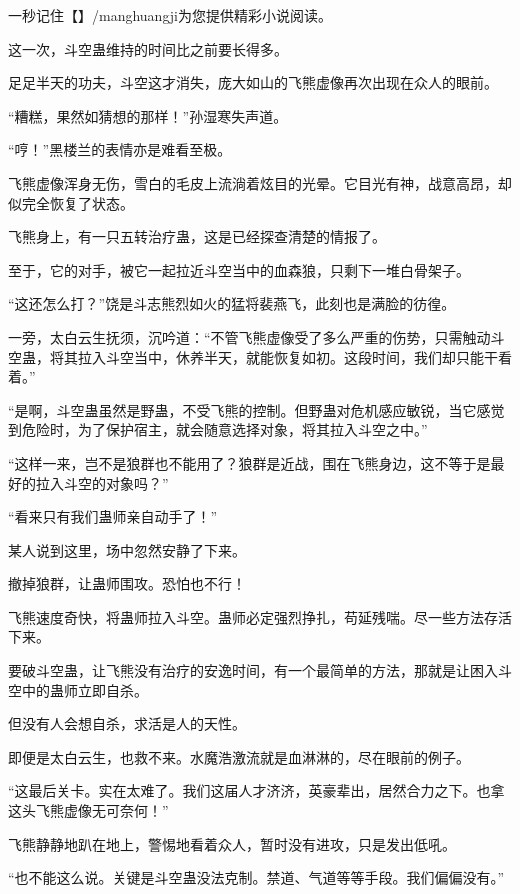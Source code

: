 
\begin{this_body}

一秒记住【】/manghuangji为您提供精彩小说阅读。

这一次，斗空蛊维持的时间比之前要长得多。

足足半天的功夫，斗空这才消失，庞大如山的飞熊虚像再次出现在众人的眼前。

“糟糕，果然如猜想的那样！”孙湿寒失声道。

“哼！”黑楼兰的表情亦是难看至极。

飞熊虚像浑身无伤，雪白的毛皮上流淌着炫目的光晕。它目光有神，战意高昂，却似完全恢复了状态。

飞熊身上，有一只五转治疗蛊，这是已经探查清楚的情报了。

至于，它的对手，被它一起拉近斗空当中的血森狼，只剩下一堆白骨架子。

“这还怎么打？”饶是斗志熊烈如火的猛将裴燕飞，此刻也是满脸的彷徨。

一旁，太白云生抚须，沉吟道：“不管飞熊虚像受了多么严重的伤势，只需触动斗空蛊，将其拉入斗空当中，休养半天，就能恢复如初。这段时间，我们却只能干看着。”

“是啊，斗空蛊虽然是野蛊，不受飞熊的控制。但野蛊对危机感应敏锐，当它感觉到危险时，为了保护宿主，就会随意选择对象，将其拉入斗空之中。”

“这样一来，岂不是狼群也不能用了？狼群是近战，围在飞熊身边，这不等于是最好的拉入斗空的对象吗？”

“看来只有我们蛊师亲自动手了！”

某人说到这里，场中忽然安静了下来。

撤掉狼群，让蛊师围攻。恐怕也不行！

飞熊速度奇快，将蛊师拉入斗空。蛊师必定强烈挣扎，苟延残喘。尽一些方法存活下来。

要破斗空蛊，让飞熊没有治疗的安逸时间，有一个最简单的方法，那就是让困入斗空中的蛊师立即自杀。

但没有人会想自杀，求活是人的天性。

即便是太白云生，也救不来。水魔浩激流就是血淋淋的，尽在眼前的例子。

“这最后关卡。实在太难了。我们这届人才济济，英豪辈出，居然合力之下。也拿这头飞熊虚像无可奈何！”

飞熊静静地趴在地上，警惕地看着众人，暂时没有进攻，只是发出低吼。

“也不能这么说。关键是斗空蛊没法克制。禁道、气道等等手段。我们偏偏没有。”


\end{this_body}
